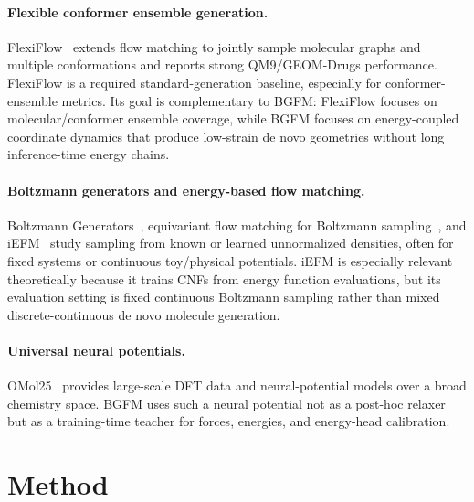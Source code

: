 \documentclass{article}
\begin{document}
\paragraph{Flexible conformer ensemble generation.}
FlexiFlow~\citep{flexiflow} extends flow matching to jointly sample molecular graphs and
multiple conformations and reports strong QM9/GEOM-Drugs performance.
FlexiFlow is a required standard-generation baseline, especially for
conformer-ensemble metrics. Its goal is complementary to BGFM:
FlexiFlow focuses on molecular/conformer ensemble coverage, while
BGFM focuses on energy-coupled coordinate dynamics that produce
low-strain de novo geometries without long inference-time energy
chains.

\paragraph{Boltzmann generators and energy-based flow matching.}
Boltzmann Generators~\citep{boltzmanngen},
equivariant flow matching for Boltzmann sampling~\citep{equivariantfm},
and iEFM~\citep{iefm} study sampling from known or learned unnormalized densities,
often for fixed systems or continuous toy/physical potentials. iEFM is
especially relevant theoretically because it trains CNFs from energy
function evaluations, but its evaluation setting is fixed continuous
Boltzmann sampling rather than mixed discrete-continuous de novo molecule
generation.

\paragraph{Universal neural potentials.}
OMol25~\citep{omol25} provides large-scale DFT data and neural-potential models over a
broad chemistry space. BGFM uses such a neural potential not as a
post-hoc relaxer but as a training-time teacher for forces, energies,
and energy-head calibration.

\section{Method}
\end{document}
